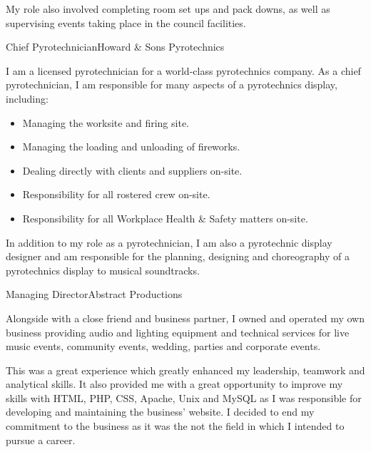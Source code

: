 \documentclass[10pt]{article}
\begin{document}
\begin{professionalExperience}
{My role also involved completing room set ups and pack downs, as well as 
supervising events taking place in the council facilities.}
{}

{Chief Pyrotechnician}{Howard \& Sons Pyrotechnics}
{I am a licensed pyrotechnician for a world-class pyrotechnics company. As a 
chief pyrotechnician, I am responsible for many aspects of a pyrotechnics 
display, including:
\begin{itemize}
	\item Managing the worksite and firing site.
	\item Managing the loading and unloading of fireworks.
	\item Dealing directly with clients and suppliers on-site.
	\item Responsibility for all rostered crew on-site.
	\item Responsibility for all Workplace Health \& Safety matters on-site.
\end{itemize}

In addition to my role as a pyrotechnician, I am also a pyrotechnic display 
designer and am responsible for the planning, designing and choreography of a 
pyrotechnics display to musical soundtracks.}
{}

{Managing Director}{Abstract Productions}
{Alongside with a close friend and business partner, I owned and operated my own
business providing audio and lighting equipment and technical services for live
music events, community events, wedding, parties and corporate events.

This was a great experience which greatly enhanced my leadership, teamwork and 
analytical skills. It also provided me with a great opportunity to improve my 
skills with HTML, PHP, CSS, Apache, Unix and MySQL as I was responsible for 
developing and maintaining the business' website. I decided to end my commitment
to the business as it was the not the field in which I intended to pursue a 
career.}
{


    
    
}

\end{professionalExperience}
\end{document}
